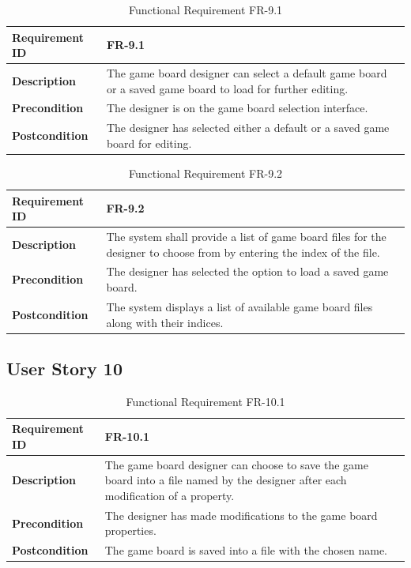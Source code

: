 \documentclass{article}
\begin{document}
\begin{table}[ht]
    \centering
    \caption{Functional Requirement FR-9.1}
    \begin{tabular}{@{}P{3cm}P{12cm}@{}}
        \toprule
        \textbf{Requirement ID} & FR-9.1 \\ \midrule
        \textbf{Description} & The game board designer can select a default game board or a saved game board to load for further editing. \\ \midrule
        \textbf{Precondition} & The designer is on the game board selection interface. \\ \midrule
        \textbf{Postcondition} & The designer has selected either a default or a saved game board for editing. \\ \bottomrule
    \end{tabular}
\end{table}

\begin{table}[ht]
    \centering
    \caption{Functional Requirement FR-9.2}
    \begin{tabular}{@{}P{3cm}P{12cm}@{}}
        \toprule
        \textbf{Requirement ID} & FR-9.2 \\ \midrule
        \textbf{Description} & The system shall provide a list of game board files for the designer to choose from by entering the index of the file. \\ \midrule
        \textbf{Precondition} & The designer has selected the option to load a saved game board. \\ \midrule
        \textbf{Postcondition} & The system displays a list of available game board files along with their indices. \\ \bottomrule
    \end{tabular}
\end{table}

\clearpage
\subsection{User Story 10}

\begin{table}[ht]
    \centering
    \caption{Functional Requirement FR-10.1}
    \begin{tabular}{@{}P{3cm}P{12cm}@{}}
        \toprule
        \textbf{Requirement ID} & FR-10.1 \\ \midrule
        \textbf{Description} & The game board designer can choose to save the game board into a file named by the designer after each modification of a property. \\ \midrule
        \textbf{Precondition} & The designer has made modifications to the game board properties. \\ \midrule
        \textbf{Postcondition} & The game board is saved into a file with the chosen name. \\ \bottomrule
    \end{tabular}
\end{table}
\end{document}
